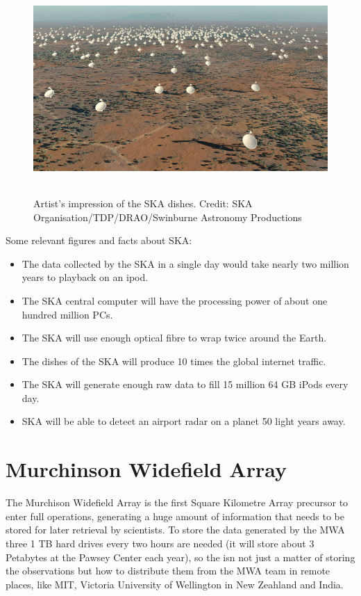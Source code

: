  \begin{figure}[H]
 \centering
 \includegraphics[height=8cm]{images/ska.jpg}
 \caption{Artist's impression of the SKA dishes. Credit: SKA Organisation/TDP/DRAO/Swinburne Astronomy Productions}
 \end{figure}

Some relevant figures and facts about SKA:

\begin{itemize}

\item The data collected by the SKA in a single day would take nearly two million years to playback on an ipod.
\item The SKA central computer will have the processing power of about one hundred million PCs.
\item The SKA will use enough optical fibre to wrap twice around the Earth.
\item The dishes of the SKA will produce 10 times the global internet traffic.
\item The SKA will generate enough raw data to fill 15 million 64 GB iPods every day.
\item SKA will be able to detect an airport radar on a planet 50 light years away.

\end{itemize}




\section{Murchinson Widefield Array}


The Murchison Widefield Array is the first Square Kilometre Array precursor to enter full operations, generating a huge amount of information that needs to be stored for later retrieval by scientists. To store the data generated by the MWA three 1 TB hard drives every two hours are needed (it will store about 3 Petabytes at the Pawsey Center each year), so the isn not just a matter of storing the observations but how to distribute them from the MWA team in remote places, like MIT, Victoria University of Wellington in New Zeahland and India. 

